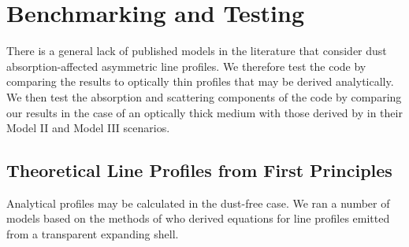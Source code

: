 \chapter{Benchmarking and Testing}\label{chp:chp3}

%
%

There is a general lack of published models in the literature that 
consider dust absorption-affected asymmetric line profiles.  We therefore test 
the code by comparing the results to optically thin profiles that may be 
derived analytically.  We then test the absorption and scattering 
components of the code by comparing our results in the case of an 
optically thick medium with those derived by \citet{Lucy1989} in their 
Model II and Model III scenarios.

\section{Theoretical Line Profiles from First Principles}
\label{analytics}

Analytical profiles may be calculated in the dust-free case.  We ran a 
number of models based on the methods of \cite{Gerasimovic1933} 
who derived equations for line profiles emitted from a transparent 
expanding shell.

